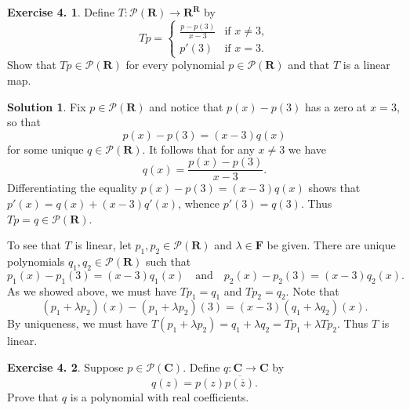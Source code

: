 \documentclass[12pt]{article}
\theoremstyle{definition}
\theoremstyle{exercise}
\newtheorem{exercise}{Exercise 4.}
\theoremstyle{solution}
\newtheorem*{solution}{Solution}
\newcommand{\poly}{\mathcal{P}}
\newcommand{\quand}{\quad \text{and} \quad}
\newcommand{\R}{\mathbf{R}}
\newcommand{\C}{\mathbf{C}}
\newcommand{\F}{\mathbf{F}}
\begin{document}
\begin{exercise}
\label{ex:8}
    Define \( T : \poly(\R) \to \R^{\R} \) by
    \[
        Tp = \begin{cases}
            \displaystyle \frac{p - p(3)}{x - 3} & \text{if } x \neq 3, \\
            p'(3) & \text{if } x = 3.
        \end{cases}
    \]
    Show that \( Tp \in \poly(\R) \) for every polynomial \( p \in \poly(\R) \) and that \( T \) is a linear map.
\end{exercise}

\begin{solution}
    Fix \( p \in \poly(\R) \) and notice that \( p(x) - p(3) \) has a zero at \( x = 3 \), so that
    \[
        p(x) - p(3) = (x - 3) q(x)
    \]
    for some unique \( q \in \poly(\R) \). It follows that for any \( x \neq 3 \) we have
    \[
        q(x) = \frac{p(x) - p(3)}{x - 3}.
    \]
    Differentiating the equality \( p(x) - p(3) = (x - 3) q(x) \) shows that \( p'(x) = q(x) + (x - 3) q'(x) \), whence \( p'(3) = q(3) \). Thus \( Tp = q \in \poly(\R) \).

    To see that \( T \) is linear, let \( p_1, p_2 \in \poly(\R) \) and \( \lambda \in \F \) be given. There are unique polynomials \( q_1, q_2 \in \poly(\R) \) such that
    \[
        p_1(x) - p_1(3) = (x - 3) q_1(x) \quand p_2(x) - p_2(3) = (x - 3) q_2(x).
    \]
    As we showed above, we must have \( Tp_1 = q_1 \) and \( Tp_2 = q_2 \). Note that
    \[
        (p_1 + \lambda p_2)(x) - (p_1 + \lambda p_2)(3) = (x - 3)(q_1 + \lambda q_2)(x).
    \]
    By uniqueness, we must have \( T(p_1 + \lambda p_2) = q_1 + \lambda q_2 = Tp_1 + \lambda Tp_2 \). Thus \( T \) is linear.
\end{solution}

\begin{exercise}
\label{ex:9}
    Suppose \( p \in \poly(\C) \). Define \( q : \C \to \C \) by
    \[
        q(z) = p(z) \overline{p(\overline{z})}.
    \]
    Prove that \( q \) is a polynomial with real coefficients.
\end{exercise}
\end{document}
